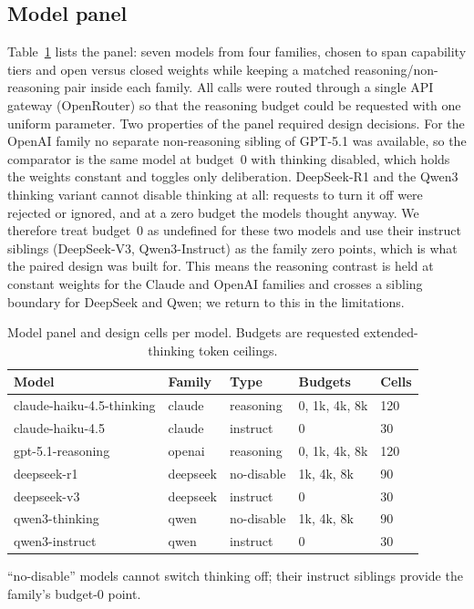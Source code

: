 \documentclass[conference]{IEEEtran}
\begin{document}
\subsection{Model panel}
Table~\ref{tab:design} lists the panel: seven models from four families, chosen to span capability tiers and open versus closed weights while keeping a matched reasoning/non-reasoning pair inside each family. All calls were routed through a single API gateway (OpenRouter) so that the reasoning budget could be requested with one uniform parameter. Two properties of the panel required design decisions. For the OpenAI family no separate non-reasoning sibling of GPT-5.1 was available, so the comparator is the same model at budget~0 with thinking disabled, which holds the weights constant and toggles only deliberation. DeepSeek-R1 and the Qwen3 thinking variant cannot disable thinking at all: requests to turn it off were rejected or ignored, and at a zero budget the models thought anyway. We therefore treat budget~0 as undefined for these two models and use their instruct siblings (DeepSeek-V3, Qwen3-Instruct) as the family zero points, which is what the paired design was built for. This means the reasoning contrast is held at constant weights for the Claude and OpenAI families and crosses a sibling boundary for DeepSeek and Qwen; we return to this in the limitations.

\begin{table}[!t]
\centering
\caption{Model panel and design cells per model. Budgets are requested extended-thinking token ceilings.}
\label{tab:design}
\footnotesize
\setlength{\tabcolsep}{3.5pt}
\begin{tabular}{lllll}
\hline
Model & Family & Type & Budgets & Cells \\
\hline
claude-haiku-4.5-thinking & claude & reasoning & 0, 1k, 4k, 8k & 120 \\
claude-haiku-4.5 & claude & instruct & 0 & 30 \\
gpt-5.1-reasoning & openai & reasoning & 0, 1k, 4k, 8k & 120 \\
deepseek-r1 & deepseek & no-disable & 1k, 4k, 8k & 90 \\
deepseek-v3 & deepseek & instruct & 0 & 30 \\
qwen3-thinking & qwen & no-disable & 1k, 4k, 8k & 90 \\
qwen3-instruct & qwen & instruct & 0 & 30 \\
\hline
\end{tabular}
\par\smallskip\footnotesize ``no-disable'' models cannot switch thinking off; their instruct siblings provide the family's budget-0 point.
\end{table}
\end{document}
